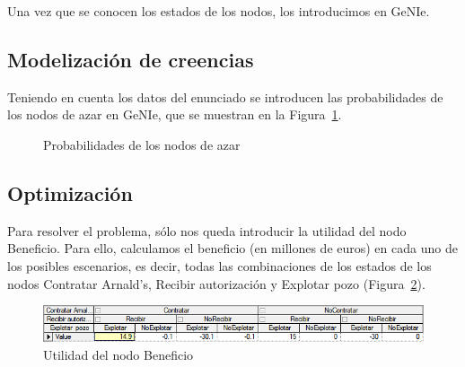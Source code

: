 \documentclass[12pt,a4paper,openright,final]{article}
\begin{document}
Una vez que se conocen los estados de los nodos, los introducimos en GeNIe.

\subsection{Modelización de creencias}

Teniendo en cuenta los datos del enunciado se introducen las probabilidades de los nodos de azar en GeNIe, que se muestran en la Figura~\ref{fig:azar}.

\begin{figure}[htbp!]
	\centering
	\hspace{10mm}
	\vspace{10mm}
	\caption{Probabilidades de los nodos de azar} \label{fig:azar}
\end{figure}

\subsection{Optimización}

Para resolver el problema, sólo nos queda introducir la utilidad del nodo Beneficio. Para ello, calculamos el beneficio (en millones de euros) en cada uno de los posibles escenarios, es decir, todas las combinaciones de los estados de los nodos Contratar Arnald's, Recibir autorización y Explotar pozo (Figura~\ref{fig:utilidad}).\\

\begin{figure}[tbph!]
	\centering
	\includegraphics[width=\linewidth]{imagenes/utilidad.png}
	\caption{Utilidad del nodo Beneficio}
	\label{fig:utilidad}
\end{figure}
\end{document}
